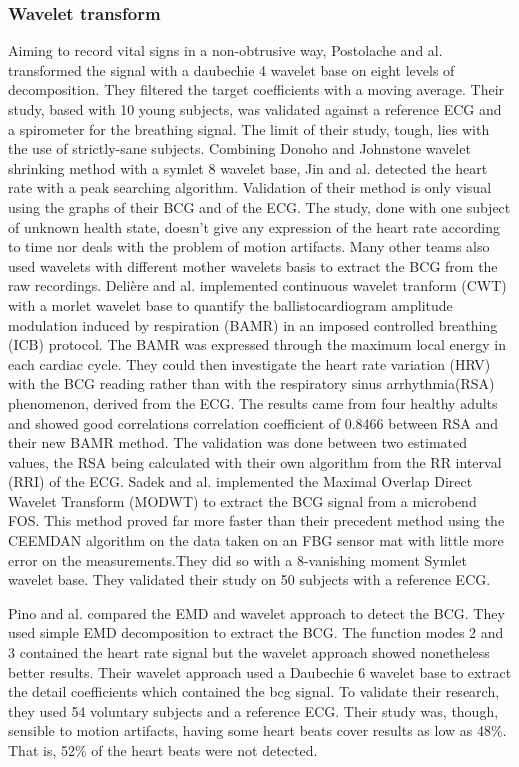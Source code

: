\documentclass[twoside,onecolumn]{article}
\begin{document}
\subsubsection{Wavelet transform}
Aiming to record vital signs in a non-obtrusive way, Postolache and al. \cite{postolache_vital_2007} transformed the signal with a daubechie 4 wavelet base on eight levels of decomposition. They filtered the target coefficients with a moving average. Their study, based with 10 young subjects, was validated against a reference ECG and a spirometer for the breathing signal. The limit of their study, tough, lies with the use of strictly-sane subjects. 
Combining Donoho and Johnstone \cite{donoho_adapting_1995} wavelet shrinking method with a symlet 8 wavelet base, Jin and al. \cite{jin_novel_2009} detected the heart rate with a peak searching algorithm. Validation of their method is only visual using the graphs of their BCG and of the ECG. The study, done with one subject of unknown health state, doesn't give any expression of the heart rate according to time nor deals with the problem of motion artifacts.
Many other teams also used wavelets with different mother wavelets basis to extract the BCG from the raw recordings. Delière and al. \cite{deliere_ballistocardiogram_2015} implemented continuous wavelet tranform (CWT) with a morlet wavelet base to quantify the ballistocardiogram amplitude modulation induced by respiration (BAMR) in an imposed controlled breathing (ICB) protocol. The BAMR was expressed through the maximum local energy in each cardiac cycle. They could then investigate the heart rate variation (HRV) with the BCG reading rather than with the respiratory sinus arrhythmia(RSA) phenomenon, derived from the ECG. The results came from four healthy adults and showed good correlations correlation coefficient of 0.8466 between RSA and their new BAMR method. The validation was done between two estimated values, the RSA being calculated with their own algorithm from the RR interval (RRI) of the ECG.
Sadek and al. \cite{sadek_continuous_2017} implemented the Maximal Overlap Direct Wavelet Transform (MODWT) to extract the BCG signal from a microbend FOS. This method proved far more faster than their precedent method using the CEEMDAN algorithm on the data taken on an FBG sensor mat with little more error on the measurements.They did so with a 8-vanishing moment Symlet  wavelet base. They validated their study on 50 subjects with a reference ECG.

Pino and al. \cite{pino_noninvasive_2015} compared the EMD and wavelet approach to detect the BCG. They used simple EMD decomposition to extract the BCG. The function modes 2 and 3 contained the heart rate signal but the wavelet approach showed nonetheless better results. Their wavelet approach used a Daubechie 6 wavelet base to extract the detail coefficients which contained the bcg signal. To validate their research, they used 54 voluntary subjects and a reference ECG. Their study was, though, sensible to motion artifacts, having some heart beats cover results as low as 48\%. That is, 52\% of the heart beats were not detected.
\end{document}
